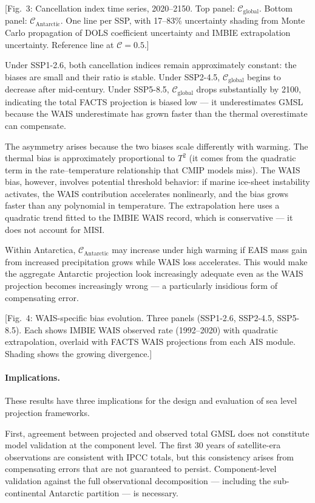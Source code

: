 \documentclass[11pt]{article}
\begin{document}
[Fig.~3: Cancellation index time series, 2020--2150.  Top panel: $\mathcal{C}_{\text{global}}$. Bottom panel: $\mathcal{C}_{\text{Antarctic}}$.  One line per SSP, with 17--83\% uncertainty shading from Monte Carlo propagation of DOLS coefficient uncertainty and IMBIE extrapolation uncertainty.  Reference line at $\mathcal{C} = 0.5$.]

Under SSP1-2.6, both cancellation indices remain approximately constant: the biases are small and their ratio is stable.  Under SSP2-4.5, $\mathcal{C}_{\text{global}}$ begins to decrease after mid-century.  Under SSP5-8.5, $\mathcal{C}_{\text{global}}$ drops substantially by 2100, indicating the total FACTS projection is biased low --- it underestimates GMSL because the WAIS underestimate has grown faster than the thermal overestimate can compensate.

The asymmetry arises because the two biases scale differently with warming.  The thermal bias is approximately proportional to $T^2$ (it comes from the quadratic term in the rate--temperature relationship that CMIP models miss).  The WAIS bias, however, involves potential threshold behavior: if marine ice-sheet instability activates, the WAIS contribution accelerates nonlinearly, and the bias grows faster than any polynomial in temperature.  The extrapolation here uses a quadratic trend fitted to the IMBIE WAIS record, which is conservative --- it does not account for MISI.

Within Antarctica, $\mathcal{C}_{\text{Antarctic}}$ may increase under high warming if EAIS mass gain from increased precipitation grows while WAIS loss accelerates.  This would make the aggregate Antarctic projection look increasingly adequate even as the WAIS projection becomes increasingly wrong --- a particularly insidious form of compensating error.

[Fig.~4: WAIS-specific bias evolution. Three panels (SSP1-2.6, SSP2-4.5, SSP5-8.5). Each shows IMBIE WAIS observed rate (1992--2020) with quadratic extrapolation, overlaid with FACTS WAIS projections from each AIS module.  Shading shows the growing divergence.]


\paragraph{Implications.}

These results have three implications for the design and evaluation of sea level projection frameworks.

First, agreement between projected and observed total GMSL does not constitute model validation at the component level.  The first 30 years of satellite-era observations are consistent with IPCC totals, but this consistency arises from compensating errors that are not guaranteed to persist.  Component-level validation against the full observational decomposition --- including the sub-continental Antarctic partition --- is necessary.
\end{document}
